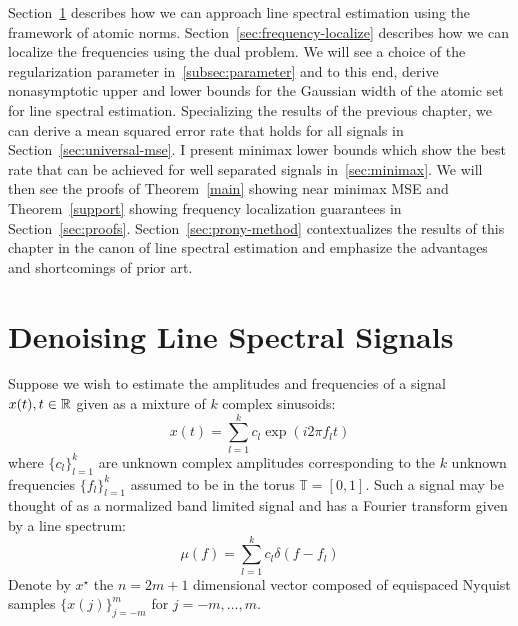 Section~\ref{sec:denoise-trig-moments} describes how we can approach line
spectral estimation using the framework of atomic norms.
Section~\ref{sec:frequency-localize} describes how we can localize the
frequencies using the dual problem. We will see a choice of the regularization
parameter in~\ref{subsec:parameter} and to this end, derive nonasymptotic upper
and lower bounds for the Gaussian width of the atomic set for line spectral
estimation. Specializing the results of the previous chapter, we can derive a
mean squared error rate that holds for all signals in
Section~\ref{sec:universal-mse}. I present minimax lower bounds which show the
best rate that can be achieved for well separated signals in~\ref{sec:minimax}.
We will then see the proofs of Theorem~\ref{main} showing near minimax MSE and
Theorem~\ref{support} showing frequency localization guarantees in
Section~\ref{sec:proofs}. Section~\ref{sec:prony-method} contextualizes the
results of this chapter in the canon of line spectral estimation and emphasize
the advantages and shortcomings of prior art.



\section{Denoising Line Spectral Signals}
\label{sec:denoise-trig-moments} 

Suppose we wish to estimate the amplitudes and frequencies of a signal $x(t), t
\in \mathbb{R}$ given as a mixture of $k$ complex sinusoids:
\begin{equation*}
  x ( t) =  \sum_{l = 1}^k c_l \exp ( i 2 \pi f_l t)
\end{equation*}
where $\{ c_l \}_{l = 1}^k$ are unknown complex amplitudes corresponding to
the $k$ unknown frequencies $\{ f_l \}_{l = 1}^k$ assumed to be in the torus
$\mathbb{T} = [0, 1]$. Such a signal may be thought of as a normalized band
limited signal and has a Fourier transform given by a line spectrum:
\begin{equation}
\label{mu}
\mu(f) = \sum_{l=1}^k c_l\delta(f - f_l)
\end{equation}
Denote by $x^\star$ the $n = 2m+1$ dimensional vector composed of equispaced 
Nyquist samples $\{x(j)\}_{j=-m}^m$   for $j=-m,\ldots,m$.

